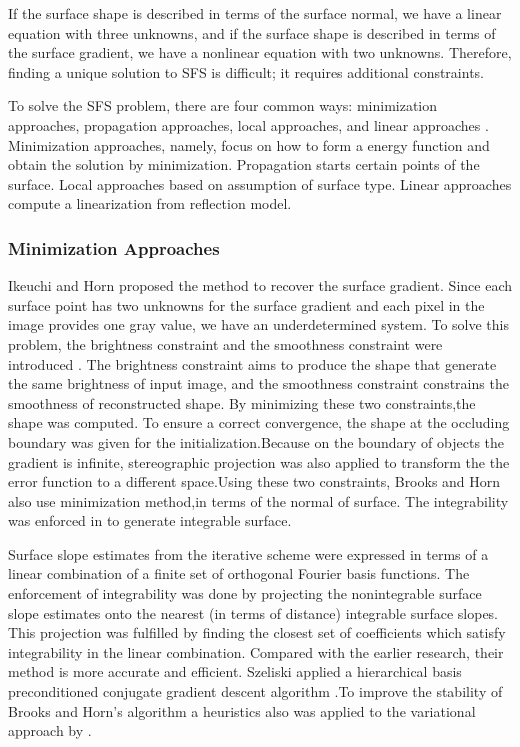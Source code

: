 If the surface shape is described in terms of the surface normal, we have a linear equation with three unknowns, and if the surface shape is described in terms of the surface gradient, we have a nonlinear equation with two unknowns. Therefore, finding a unique solution to SFS is difficult; it requires additional constraints.

To solve the SFS problem, there are four common ways: minimization approaches, propagation approaches, local approaches, and linear approaches \cite{zhang1999shape}. Minimization approaches, namely, focus on how to form a energy function and obtain the solution by minimization. Propagation starts certain points of the surface. Local approaches based on assumption of surface type. Linear approaches compute a linearization from reflection model. 

\subsubsection{Minimization Approaches}
Ikeuchi and Horn \cite{ikeuchi1981numerical} proposed the method to recover the surface gradient. Since each surface point has two unknowns for the surface gradient and each pixel in the image provides one gray value, we have an underdetermined system. To solve this problem,  the brightness constraint and the smoothness constraint were introduced . The brightness constraint aims to produce the shape that generate the same brightness of input image, and the smoothness constraint constrains the smoothness of reconstructed shape. By minimizing these two constraints,the shape was computed. To ensure a correct convergence, the shape at the occluding boundary was given for the initialization.Because on the boundary of objects the gradient is infinite, stereographic projection was also applied to transform the the error function to a different space.Using these two constraints, Brooks and Horn \cite{brooks1985shape} also use minimization method,in terms of the normal of surface. The integrability was enforced in \cite{frankot1988method} to generate integrable surface.

Surface slope estimates from the iterative scheme were expressed in terms of a linear combination of a finite set of orthogonal Fourier basis functions. The enforcement of integrability was done by projecting the nonintegrable surface slope estimates onto the nearest (in terms of distance) integrable surface slopes.
This projection was fulfilled by finding the closest set of coefficients which satisfy integrability in the linear combination. Compared with the earlier research, their method is more accurate and efficient. Szeliski \cite{szeliski1991fast} applied a hierarchical basis preconditioned conjugate gradient descent algorithm .To improve the stability of Brooks and Horn’s algorithm a heuristics also was applied to the variational approach by \cite{vega1993shading}.

